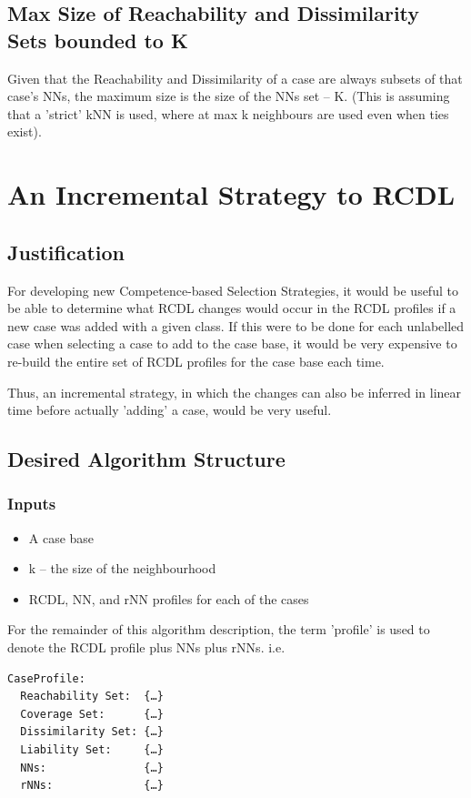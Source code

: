 \documentclass[a4paper,11pt]{report}
\begin{document}
\subsection{Max Size of Reachability and Dissimilarity Sets bounded to K}
Given that the Reachability and Dissimilarity of a case are always subsets of that case's NNs, the maximum size is the size of the NNs set – K. (This is assuming that a 'strict' kNN is used, where at max k neighbours are used even when ties exist).

\section{An Incremental Strategy to RCDL}
\subsection{Justification}
For developing new Competence-based Selection Strategies, it would be useful to be able to determine what RCDL changes would occur in the RCDL profiles if a new case was added with a given class. If this were to be done for each unlabelled case when selecting a case to add to the case base, it would be very expensive to re-build the entire set of RCDL profiles for the case base each time.

Thus, an incremental strategy, in which the changes can also be inferred in linear time before actually 'adding' a case, would be very useful.

\subsection{Desired Algorithm Structure}
\subsubsection{Inputs}
\begin{itemize}
	\item A case base 
	\item k – the size of the neighbourhood
	\item RCDL, NN, and rNN profiles for each of the cases
\end{itemize}

For the remainder of this algorithm description, the term 'profile' is used to denote the RCDL profile plus NNs plus rNNs. i.e. 
\begin{verbatim}
CaseProfile:  
  Reachability Set:  {…}
  Coverage Set:      {…}
  Dissimilarity Set: {…}
  Liability Set:     {…}
  NNs:               {…}
  rNNs:              {…}
\end{verbatim}
\end{document}
